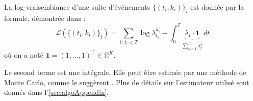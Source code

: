 \documentclass[11pt]{article}
\newcommand{\RR}{\mathbb{R}}
\begin{document}
La log-vraisemblance d'une suite d'événements $\{(t_i,k_i)\}_i$ est donnée par la formule, démontrée dans \autocite{meiEisnerNeuralHawkes}:
\begin{equation}\label{eq:explicitLikelihood}
\mathcal{L}\left(\{(t_i,k_i)\}_i\right)
=
\sum_{i:\,t_i < T} \log\lambda^{k_i}_{t_i} - \int_0^T \underbrace{\lambda_t\cdot\mathbf{1}}_{\sum_{k=1}^K\lambda^j_t}\,dt
\end{equation}
où on a noté $\mathbf{1} = {(1,\ldots,1)}^\intercal\in\RR^K$.

Le second terme est une intégrale. Elle peut être estimée par une méthode de Monte Carlo, comme le suggèrent \citeauthor{meiEisnerNeuralHawkes}. Plus de détails sur l'estimateur utilisé sont donnés dans l'\autoref{sec:algoAppendix}.


\printbibliography
\end{document}

